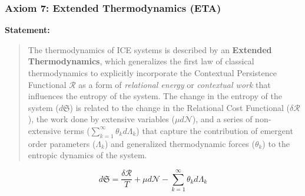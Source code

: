 \documentclass{article}
\begin{document}
\subsubsection{Axiom 7: Extended Thermodynamics (ETA)}
\label{ax:termodinamica}

\textbf{Statement:}
\begin{quote}
    The thermodynamics of ICE systems is described by an \textbf{Extended Thermodynamics}, which generalizes the first law of classical thermodynamics to explicitly incorporate the Contextual Persistence Functional $\mathcal{R}$ as a form of \textit{relational energy} or \textit{contextual work} that influences the entropy of the system. The change in the entropy of the system ($d\mathfrak{S}$) is related to the change in the Relational Cost Functional ($\delta\mathcal{R}$), the work done by extensive variables ($\mu d\mathcal{N}$), and a series of non-extensive terms ($\sum_{k=1}^\infty \theta_k d\Lambda_k$) that capture the contribution of emergent order parameters ($\Lambda_k$) and generalized thermodynamic forces ($\theta_k$) to the entropic dynamics of the system.
\end{quote}


\begin{equation}
d\mathfrak{S} = \frac{\delta\mathcal{R}}{T} + \mu d\mathcal{N} - \sum_{k=1}^\infty \theta_k d\Lambda_k
\label{eq:termodinamica_extendida}
\end{equation}
\bigskip
\end{document}

